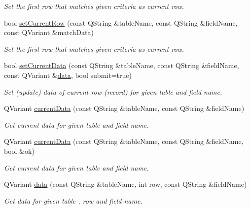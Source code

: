 \begin{DoxyCompactItemize}
\begin{DoxyCompactList}\small\item\em Set the first row that matches given criteria as current row. \end{DoxyCompactList}\item 
bool \hyperlink{classmdt_sql_form_abd4c01483812a53edc4be116a7dd2612}{set\-Current\-Row} (const Q\-String \&table\-Name, const Q\-String \&field\-Name, const Q\-Variant \&match\-Data)
\begin{DoxyCompactList}\small\item\em Set the first row that matches given criteria as current row. \end{DoxyCompactList}\item 
bool \hyperlink{classmdt_sql_form_aa377e70f4a2e865b0b696957c0fca766}{set\-Current\-Data} (const Q\-String \&table\-Name, const Q\-String \&field\-Name, const Q\-Variant \&\hyperlink{classmdt_sql_form_a0c27d6a9ecbf0589f313c7193c632a62}{data}, bool submit=true)
\begin{DoxyCompactList}\small\item\em Set (update) data of current row (record) for given table and field name. \end{DoxyCompactList}\item 
Q\-Variant \hyperlink{classmdt_sql_form_aca283557b7e2586779cb5c498d388f14}{current\-Data} (const Q\-String \&table\-Name, const Q\-String \&field\-Name)
\begin{DoxyCompactList}\small\item\em Get current data for given table and field name. \end{DoxyCompactList}\item 
Q\-Variant \hyperlink{classmdt_sql_form_af24711f9c18a1009352b62d47b9758d7}{current\-Data} (const Q\-String \&table\-Name, const Q\-String \&field\-Name, bool \&ok)
\begin{DoxyCompactList}\small\item\em Get current data for given table and field name. \end{DoxyCompactList}\item 
Q\-Variant \hyperlink{classmdt_sql_form_a0c27d6a9ecbf0589f313c7193c632a62}{data} (const Q\-String \&table\-Name, int row, const Q\-String \&field\-Name)
\begin{DoxyCompactList}\small\item\em Get data for given table , row and field name. \end{DoxyCompactList}\item 

\end{DoxyCompactItemize}

